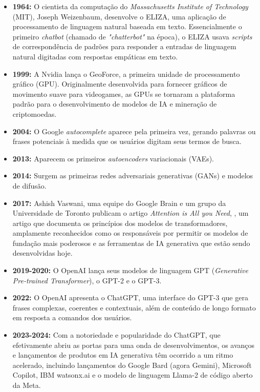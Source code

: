\documentclass[a4paper, 12pt]{article}
\newcommand{\citeb}[1]{\bibleftbracket\cite{#1}\bibrightbracket}
\begin{document}
    \begin{itemize}
        \item \textbf{1964:} O cientista da computação do \textit{Massachusetts Institute of Technology} (MIT), Joseph Weizenbaum, desenvolve o ELIZA, uma aplicação de processamento de linguagem natural baseada em texto. Essencialmente o primeiro \textit{chatbot} (chamado de \textit{"chatterbot"} na época), o ELIZA usava \textit{scripts} de correspondência de padrões para responder a entradas de linguagem natural digitadas com respostas empáticas em texto.

        \item \textbf{1999:} A Nvidia lança o GeoForce, a primeira unidade de processamento gráfico (GPU). Originalmente desenvolvida para fornecer gráficos de movimento suave para videogames, as GPUs se tornaram a plataforma padrão para o desenvolvimento de modelos de IA e mineração de criptomoedas.

        \item \textbf{2004:} O Google \textit{autocomplete} aparece pela primeira vez, gerando palavras ou frases potenciais à medida que os usuários digitam seus termos de busca.

        \item \textbf{2013:} Aparecem os primeiros \textit{autoencoders} variacionais (VAEs).

        \item \textbf{2014:} Surgem as primeiras redes adversariais generativas (GANs) e modelos de difusão.

        \item \textbf{2017:} Ashish Vaswani, uma equipe do Google Brain e um grupo da Universidade de Toronto publicam o artigo \textit{Attention is All you Need}, \citeb{att_all_u_need}, um artigo que documenta os princípios dos modelos de transformadores, amplamente reconhecidos como os responsáveis por permitir os modelos de fundação mais poderosos e as ferramentas de IA generativa que estão sendo desenvolvidas hoje.

        \item \textbf{2019-2020:} O OpenAI lança seus modelos de linguagem GPT (\textit{Generative Pre-trained Transformer}), o GPT-2 e o GPT-3.

        \item \textbf{2022:} O OpenAI apresenta o ChatGPT, uma interface do GPT-3 que gera frases complexas, coerentes e contextuais, além de conteúdo de longo formato em resposta a comandos dos usuários.
        
        \item \textbf{2023-2024:} Com a notoriedade e popularidade do ChatGPT, que efetivamente abriu as portas para uma onda de desenvolvimentos, os avanços e lançamentos de produtos em IA generativa têm ocorrido a um ritmo acelerado, incluindo lançamentos do Google Bard (agora Gemini), Microsoft Copilot, IBM watsonx.ai e o modelo de linguagem Llama-2 de código aberto da Meta.
    \end{itemize}
\end{document}
